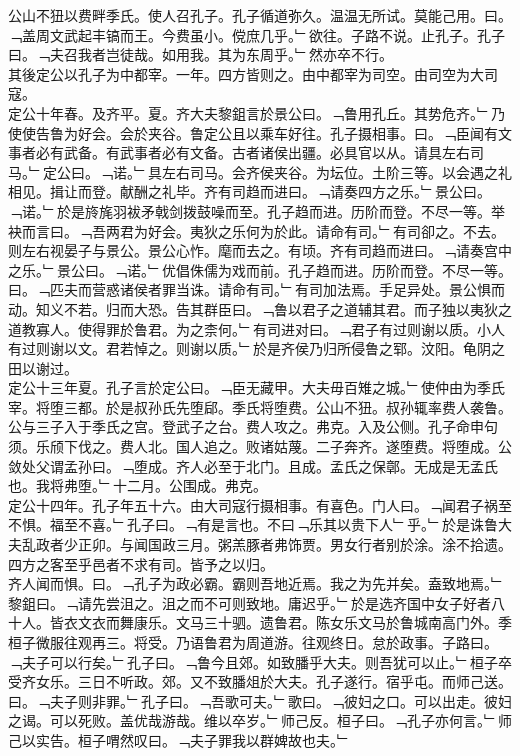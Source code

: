 \documentclass{zhvt-classic}
\begin{document}
\hspace*{2em}公山不狃以费畔季氏。使人召孔子。孔子循道弥久。温温无所试。莫能己用。曰。﹁盖周文武起丰镐而王。今费虽小。傥庶几乎。﹂欲往。子路不说。止孔子。孔子曰。﹁夫召我者岂徒哉。如用我。其为东周乎。﹂然亦卒不行。\\
\hspace*{2em}其後定公以孔子为中都宰。一年。四方皆则之。由中都宰为司空。由司空为大司寇。\\
\hspace*{2em}定公十年春。及齐平。夏。齐大夫黎鉏言於景公曰。﹁鲁用孔丘。其势危齐。﹂乃使使告鲁为好会。会於夹谷。鲁定公且以乘车好往。孔子摄相事。曰。﹁臣闻有文事者必有武备。有武事者必有文备。古者诸侯出疆。必具官以从。请具左右司马。﹂定公曰。﹁诺。﹂具左右司马。会齐侯夹谷。为坛位。土阶三等。以会遇之礼相见。揖让而登。献酬之礼毕。齐有司趋而进曰。﹁请奏四方之乐。﹂景公曰。﹁诺。﹂於是旍旄羽袚矛戟剑拨鼓噪而至。孔子趋而进。历阶而登。不尽一等。举袂而言曰。﹁吾两君为好会。夷狄之乐何为於此。请命有司。﹂有司卻之。不去。则左右视晏子与景公。景公心怍。麾而去之。有顷。齐有司趋而进曰。﹁请奏宫中之乐。﹂景公曰。﹁诺。﹂优倡侏儒为戏而前。孔子趋而进。历阶而登。不尽一等。曰。﹁匹夫而营惑诸侯者罪当诛。请命有司。﹂有司加法焉。手足异处。景公惧而动。知义不若。归而大恐。告其群臣曰。﹁鲁以君子之道辅其君。而子独以夷狄之道教寡人。使得罪於鲁君。为之柰何。﹂有司进对曰。﹁君子有过则谢以质。小人有过则谢以文。君若悼之。则谢以质。﹂於是齐侯乃归所侵鲁之郓。汶阳。龟阴之田以谢过。\\
\hspace*{2em}定公十三年夏。孔子言於定公曰。﹁臣无藏甲。大夫毋百雉之城。﹂使仲由为季氏宰。将堕三都。於是叔孙氏先堕郈。季氏将堕费。公山不狃。叔孙辄率费人袭鲁。公与三子入于季氏之宫。登武子之台。费人攻之。弗克。入及公侧。孔子命申句须。乐颀下伐之。费人北。国人追之。败诸姑蔑。二子奔齐。遂堕费。将堕成。公敛处父谓孟孙曰。﹁堕成。齐人必至于北门。且成。孟氏之保鄣。无成是无孟氏也。我将弗堕。﹂十二月。公围成。弗克。\\
\hspace*{2em}定公十四年。孔子年五十六。由大司寇行摄相事。有喜色。门人曰。﹁闻君子祸至不惧。福至不喜。﹂孔子曰。﹁有是言也。不曰﹁乐其以贵下人﹂乎。﹂於是诛鲁大夫乱政者少正卯。与闻国政三月。粥羔豚者弗饰贾。男女行者别於涂。涂不拾遗。四方之客至乎邑者不求有司。皆予之以归。\\
\hspace*{2em}齐人闻而惧。曰。﹁孔子为政必霸。霸则吾地近焉。我之为先并矣。盍致地焉。﹂黎鉏曰。﹁请先尝沮之。沮之而不可则致地。庸迟乎。﹂於是选齐国中女子好者八十人。皆衣文衣而舞康乐。文马三十驷。遗鲁君。陈女乐文马於鲁城南高门外。季桓子微服往观再三。将受。乃语鲁君为周道游。往观终日。怠於政事。子路曰。﹁夫子可以行矣。﹂孔子曰。﹁鲁今且郊。如致膰乎大夫。则吾犹可以止。﹂桓子卒受齐女乐。三日不听政。郊。又不致膰俎於大夫。孔子遂行。宿乎屯。而师己送。曰。﹁夫子则非罪。﹂孔子曰。﹁吾歌可夫。﹂歌曰。﹁彼妇之口。可以出走。彼妇之谒。可以死败。盖优哉游哉。维以卒岁。﹂师己反。桓子曰。﹁孔子亦何言。﹂师己以实告。桓子喟然叹曰。﹁夫子罪我以群婢故也夫。﹂\\
\end{document}
